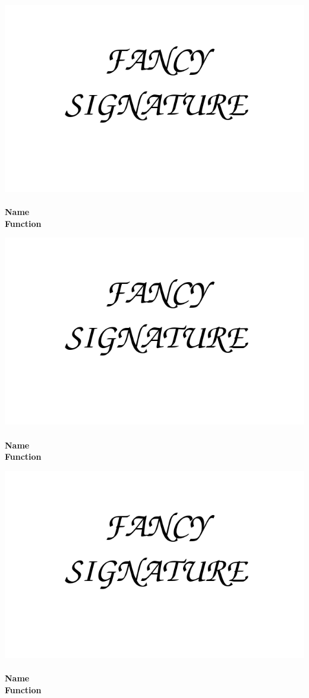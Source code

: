 \documentclass[16pt,a4paper]{scrartcl}              %
\begin{document}
		{\singlespacing 
			\vfill
			\begin{minipage}[l]{2.8in}
				\centering
				\includegraphics[width=.5\linewidth]{../signature-template.png} \\
				\vrule width 2.8in height 0.4pt\\\small \bfseries\color{g} Name \\ 
					\bfseries\color{g} Function
			\end{minipage}
			\hfill
			\begin{minipage}[c]{2.8in}
				\centering
				\includegraphics[width=.5\linewidth]{../signature-template.png} \\
				\vrule width 2.8in height 0.4pt\\\small \bfseries\color{g} Name \\ 
				\bfseries\color{g} Function
			\end{minipage}
			\hfill
			\begin{minipage}[r]{2.8in}
				\centering
				\includegraphics[width=.5\linewidth]{../signature-template.png} \\
				\vrule width 2.8in height 0.4pt\\\small \bfseries\color{g} Name \\ 
				\bfseries\color{g} Function
			\end{minipage}}

		\pagebreak
\end{document}
